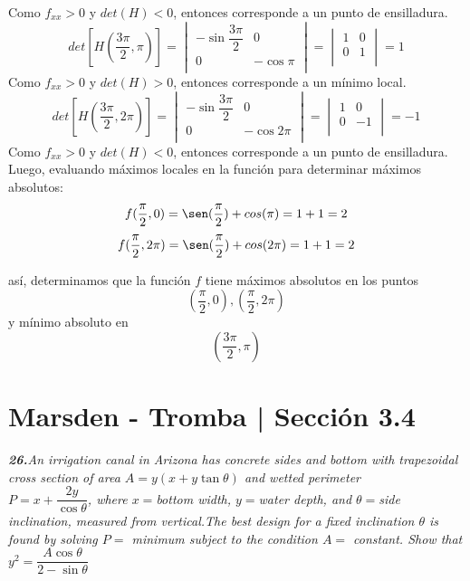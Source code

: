 \documentclass[a4paper,12pt]{article}
\begin{document}
		Como $f_{xx} > 0$ y $det(H) < 0$, entonces corresponde a un punto de ensilladura.\\
		$$det[H(\frac{3\pi}{2}, \pi)] =
			\begin{vmatrix}
				-\sin \dfrac{3\pi}{2} & 0 \\
				0  & - \cos \pi \\
			\end{vmatrix} =
			\begin{vmatrix}
				1 & 0 \\
				 0 & 1 \\
			\end{vmatrix} = 1$$
		Como $f_{xx} > 0$ y $det(H) > 0$, entonces corresponde a un mínimo local.\\
		$$det[H(\frac{3\pi}{2}, 2\pi)] =
			\begin{vmatrix}
				-\sin \dfrac{3\pi}{2} & 0 \\
				0  & - \cos 2\pi \\
			\end{vmatrix} =
			\begin{vmatrix}
				1 & 0 \\
				 0 & -1 \\
			\end{vmatrix} = -1$$
		Como $f_{xx} > 0$ y $det(H) < 0$, entonces corresponde a un punto de ensilladura.\\


		Luego, evaluando máximos locales en la función para determinar
		máximos absolutos:
			$$ f(\frac{\pi}{2}, 0) = \sen(\frac{\pi}{2}) + cos(\pi) = 1 + 1 = 2 $$
			$$ f(\frac{\pi}{2}, 2\pi) = \sen(\frac{\pi}{2}) + cos(2\pi) = 1 + 1 = 2$$

		así, determinamos que la función $f$ tiene máximos absolutos en los puntos
			$$(\frac{\pi}{2}, 0), (\frac{\pi}{2}, 2\pi)$$
		y mínimo absoluto en
			$$(\frac{3\pi}{2}, \pi)$$

	\section{Marsden - Tromba | Sección 3.4}
	\textit{\textbf{26.}An irrigation canal in Arizona has concrete sides and bottom with trapezoidal cross section of area
 $A = y(x + y \tan \theta)$ and wetted perimeter \\
 $P = x + \dfrac{2y}{\cos \theta}$, where $x = $bottom width, $y = $water depth, and $\theta =$side inclination, measured
 from vertical.The best design for a fixed inclination $\theta$ is found by solving $P =$ minimum subject to the condition
 $A =$ constant. Show that $y^2 =\dfrac{A \cos \theta}{2 - \sin \theta}$ 
}
\end{document}
